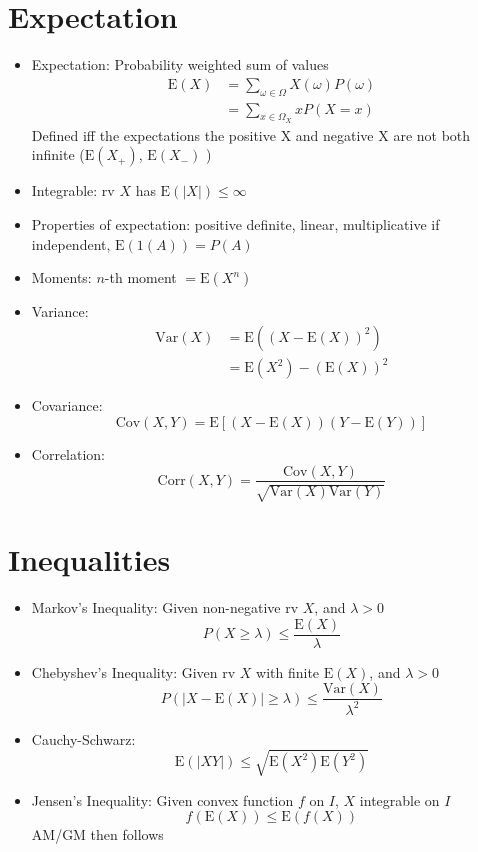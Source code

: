 \section{Expectation}
\begin{itemize}
      \item Expectation: Probability weighted sum of values
            \begin{align*}
                  \text{E}(X) & = \sum_{\omega \in \Omega} X(\omega) P(\omega) \\
                              & = \sum_{x \in \Omega_X} x P(X=x)
            \end{align*}
            Defined iff the expectations the positive X and negative X are not both infinite ($\text{E}(X_+)$, $\text{E}(X_-)$ )

      \item Integrable: rv $X$ has $\text{E}(|X|) \leq \infty$
      \item Properties of expectation: positive definite, linear, multiplicative if independent, $\text{E}(1(A)) = P(A)$

      \item Moments: $n$-th moment $=\text{E}(X^n)$
      \item Variance:
            \begin{align*}
                  \text{Var}(X) & = \text{E}((X-\text{E}(X))^2)  \\
                                & =\text{E}(X^2)-(\text{E}(X))^2
            \end{align*}

      \item Covariance:
            \[\text{Cov}(X,Y) = \text{E}[(X-\text{E}(X))(Y-\text{E}(Y))] \]

      \item Correlation:
            \[\text{Corr}(X,Y) = \frac{\text{Cov}(X,Y)}{\sqrt{\text{Var}(X)\text{Var}(Y)}}\]
\end{itemize}


\section{Inequalities}

\begin{itemize}
      \item Markov's Inequality: Given non-negative rv $X$, and $\lambda > 0$
            \[P(X \geq \lambda) \leq \frac{\text{E}(X)}{\lambda}\]

      \item Chebyshev's Inequality: Given rv $X$ with finite $\text{E}(X)$, and $\lambda > 0$
            \[ P(|X-\text{E}(X)| \geq \lambda ) \leq \frac{\text{Var}(X)}{\lambda^2}\]

      \item Cauchy-Schwarz: \[\text{E}(|XY|) \leq \sqrt{\text{E}(X^2)\text{E}(Y^2)}\]

      \item Jensen's Inequality: Given convex function $f$ on $I$, $X$ integrable on $I$
            \[f(\text{E}(X)) \leq \text{E}(f(X))\]
            AM/GM then follows
\end{itemize}

